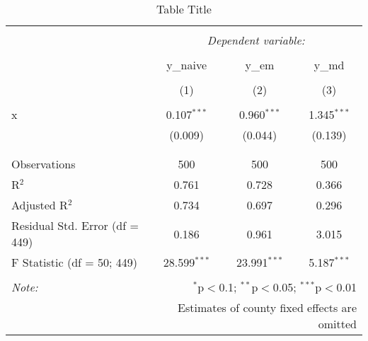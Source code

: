 
\begin{table}[!htbp] \centering 
  \caption{Table Title} 
  \label{} 
\begin{tabular}{@{\extracolsep{5pt}}lccc} 
\\[-1.8ex]\hline 
\hline \\[-1.8ex] 
 & \multicolumn{3}{c}{\textit{Dependent variable:}} \\ 
\cline{2-4} 
\\[-1.8ex] & y\_naive & y\_em & y\_md \\ 
\\[-1.8ex] & (1) & (2) & (3)\\ 
\hline \\[-1.8ex] 
 x & 0.107$^{***}$ & 0.960$^{***}$ & 1.345$^{***}$ \\ 
  & (0.009) & (0.044) & (0.139) \\ 
  & & & \\ 
\hline \\[-1.8ex] 
Observations & 500 & 500 & 500 \\ 
R$^{2}$ & 0.761 & 0.728 & 0.366 \\ 
Adjusted R$^{2}$ & 0.734 & 0.697 & 0.296 \\ 
Residual Std. Error (df = 449) & 0.186 & 0.961 & 3.015 \\ 
F Statistic (df = 50; 449) & 28.599$^{***}$ & 23.991$^{***}$ & 5.187$^{***}$ \\ 
\hline 
\hline \\[-1.8ex] 
\textit{Note:}  & \multicolumn{3}{r}{$^{*}$p$<$0.1; $^{**}$p$<$0.05; $^{***}$p$<$0.01} \\ 
 & \multicolumn{3}{r}{Estimates of county fixed effects are omitted} \\ 
\end{tabular} 
\end{table} 
